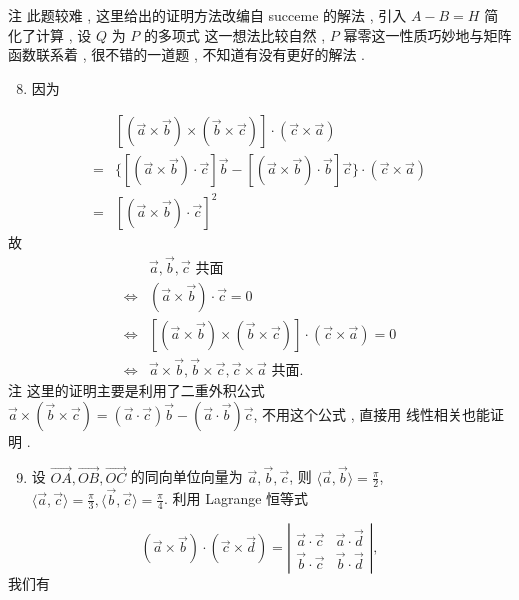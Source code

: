 \documentclass[10pt]{article}
\begin{document}
 注   此题较难 ,  这里给出的证明方法改编自  succeme  的解法 ,  引入  $A-B=H$  简化了计算 ,  设  $Q$  为  $P$  的多项式   这一想法比较自然 , $P$  幂零这一性质巧妙地与矩阵函数联系着 ,  很不错的一道题 ,  不知道有没有更好的解法 .

\begin{enumerate}
  \setcounter{enumi}{7}
  \item  因为 
\end{enumerate}
$$
\begin{aligned}
& {[(\vec{a} \times \vec{b}) \times(\vec{b} \times \vec{c})] \cdot(\vec{c} \times \vec{a}) } \\
=&\{[(\vec{a} \times \vec{b}) \cdot \vec{c}] \vec{b}-[(\vec{a} \times \vec{b}) \cdot \vec{b}] \vec{c}\} \cdot(\vec{c} \times \vec{a}) \\
=& {[(\vec{a} \times \vec{b}) \cdot \vec{c}]^{2} }
\end{aligned}
$$
 故 
$$
\begin{aligned}
& \vec{a}, \vec{b}, \vec{c} \text { 共面 } \\
\Longleftrightarrow &(\vec{a} \times \vec{b}) \cdot \vec{c}=0 \\
\Longleftrightarrow & {[(\vec{a} \times \vec{b}) \times(\vec{b} \times \vec{c})] \cdot(\vec{c} \times \vec{a})=0 } \\
\Longleftrightarrow & \vec{a} \times \vec{b}, \vec{b} \times \vec{c}, \vec{c} \times \vec{a} \text { 共面. }
\end{aligned}
$$
 注   这里的证明主要是利用了二重外积公式  $\vec{a} \times(\vec{b} \times \vec{c})=(\vec{a} \cdot \vec{c}) \vec{b}-(\vec{a} \cdot \vec{b}) \vec{c}$,  不用这个公式 ,  直接用   线性相关也能证明 .

\begin{enumerate}
  \setcounter{enumi}{8}
  \item  设  $\overrightarrow{O A}, \overrightarrow{O B}, \overrightarrow{O C}$  的同向单位向量为  $\vec{a}, \vec{b}, \vec{c}$,  则  $\langle\vec{a}, \vec{b}\rangle=\frac{\pi}{2}$, $\langle\vec{a}, \vec{c}\rangle=\frac{\pi}{3},\langle\vec{b}, \vec{c}\rangle=\frac{\pi}{4}$.  利用  Lagrange  恒等式 
\end{enumerate}
$$
(\vec{a} \times \vec{b}) \cdot(\vec{c} \times \vec{d})=\left|\begin{array}{ll}
\vec{a} \cdot \vec{c} & \vec{a} \cdot \vec{d} \\
\vec{b} \cdot \vec{c} & \vec{b} \cdot \vec{d}
\end{array}\right|,
$$
 我们有 
\end{document}

